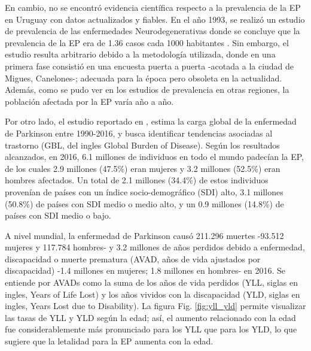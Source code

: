 En cambio, no se encontró evidencia científica respecto a la prevalencia de la EP en Uruguay con datos actualizados y fiables. En el año 1993, se realizó un estudio de prevalencia de las enfermedades Neurodegenerativas donde se concluye que la prevalencia de la EP era de 1.36 casos cada 1000 habitantes \cite{AljanatiR2012}. Sin embargo, el estudio resulta arbitrario debido a la metodología utilizada, donde  en una primera fase consistió en una encuesta puerta a puerta -acotada a la ciudad de Migues, Canelones-; adecuada para la época pero obsoleta en la actualidad. Además, como se pudo ver en los estudios de prevalencia en otras regiones, la población afectada por la EP varía año a año. 

Por otro lado, el estudio reportado en \cite{Dorsey2018}, estima la carga global de la enfermedad de Parkinson entre 1990-2016, y busca identificar tendencias asociadas al trastorno (GBL, del ingles Global Burden of Disease). Según los resultados alcanzados, en 2016, 6.1 millones de individuos en todo el mundo padecían la EP, de los cuales 2.9 millones (47.5\%) eran mujeres y 3.2 millones (52.5\%) eran hombres afectados. Un total de 2.1 millones (34.4\%) de estos individuos provenían de países con un índice socio-demográfico (SDI) alto, 3.1 millones (50.8\%) de países con SDI medio o medio alto, y un 0.9 millones (14.8\%) de países con SDI medio o bajo. 

\noindent A nivel mundial, la enfermedad de Parkinson causó 211.296 muertes -93.512 mujeres y 117.784 hombres- y 3.2 millones de años perdidos debido a enfermedad, discapacidad o muerte prematura (AVAD, años de vida ajustados por discapacidad) -1.4 millones en mujeres; 1.8 millones en hombres- en 2016. Se entiende por AVADs como la suma de los años de vida perdidos (YLL, siglas en ingles, Years of Life Lost) y los años vividos con la discapacidad (YLD, siglas en ingles, Years Lost due to Disability). La figura Fig. \ref{fig:yll_yld} permite visualizar las tasas de YLL y YLD según la edad; así, el aumento relacionado con la edad fue considerablemente más pronunciado para los YLL que para los YLD, lo que sugiere que la letalidad para la EP aumenta con la edad.

